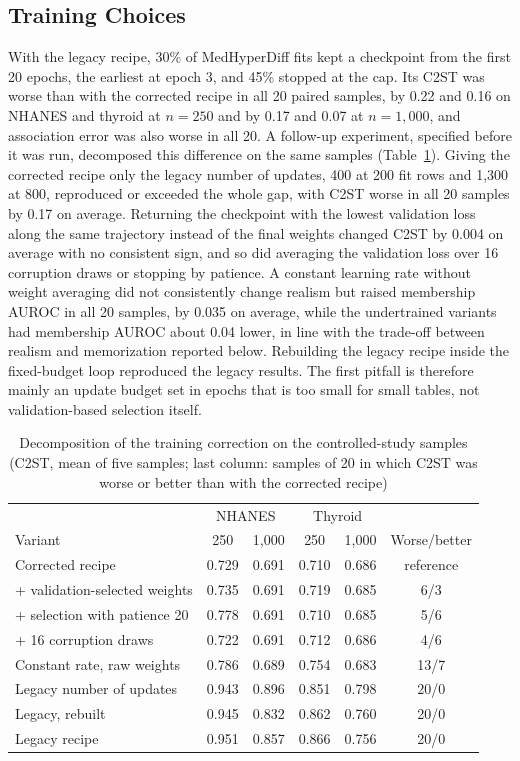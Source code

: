 \documentclass[conference]{IEEEtran}
\begin{document}
\subsection*{Training Choices}

With the legacy recipe, 30\% of MedHyperDiff fits kept a checkpoint from the first 20 epochs, the earliest at epoch 3, and 45\% stopped at the cap. Its C2ST was worse than with the corrected recipe in all 20 paired samples, by 0.22 and 0.16 on NHANES and thyroid at $n = 250$ and by 0.17 and 0.07 at $n = 1{,}000$, and association error was also worse in all 20. A follow-up experiment, specified before it was run, decomposed this difference on the same samples (Table~\ref{tab:decomp}). Giving the corrected recipe only the legacy number of updates, 400 at 200 fit rows and 1,300 at 800, reproduced or exceeded the whole gap, with C2ST worse in all 20 samples by 0.17 on average. Returning the checkpoint with the lowest validation loss along the same trajectory instead of the final weights changed C2ST by 0.004 on average with no consistent sign, and so did averaging the validation loss over 16 corruption draws or stopping by patience. A constant learning rate without weight averaging did not consistently change realism but raised membership AUROC in all 20 samples, by 0.035 on average, while the undertrained variants had membership AUROC about 0.04 lower, in line with the trade-off between realism and memorization reported below. Rebuilding the legacy recipe inside the fixed-budget loop reproduced the legacy results. The first pitfall is therefore mainly an update budget set in epochs that is too small for small tables, not validation-based selection itself.

\begin{table}[t]
\caption{Decomposition of the training correction on the controlled-study samples (C2ST, mean of five samples; last column: samples of 20 in which C2ST was worse or better than with the corrected recipe)}
\label{tab:decomp}
\centering
\setlength{\tabcolsep}{2.4pt}
\begin{tabular}{lccccc}
\toprule
& \multicolumn{2}{c}{NHANES} & \multicolumn{2}{c}{Thyroid} & \\
Variant & 250 & 1,000 & 250 & 1,000 & Worse/better \\
\midrule
Corrected recipe & 0.729 & 0.691 & 0.710 & 0.686 & reference \\
+ validation-selected weights & 0.735 & 0.691 & 0.719 & 0.685 & 6/3 \\
+ selection with patience 20 & 0.778 & 0.691 & 0.710 & 0.685 & 5/6 \\
+ 16 corruption draws & 0.722 & 0.691 & 0.712 & 0.686 & 4/6 \\
Constant rate, raw weights & 0.786 & 0.689 & 0.754 & 0.683 & 13/7 \\
Legacy number of updates & 0.943 & 0.896 & 0.851 & 0.798 & 20/0 \\
Legacy, rebuilt & 0.945 & 0.832 & 0.862 & 0.760 & 20/0 \\
Legacy recipe & 0.951 & 0.857 & 0.866 & 0.756 & 20/0 \\
\bottomrule
\end{tabular}
\end{table}
\end{document}
